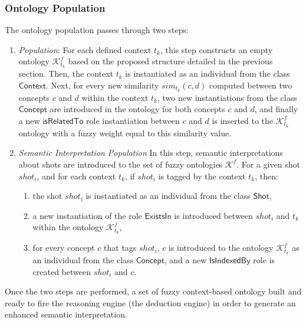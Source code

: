 		\subsubsection{Ontology Population}	
		\label{pop1}
		The ontology population  passes through two steps: 
		\begin{enumerate}
			\item \textit{ Population}: For each defined context $t_{k}$, 
			this step constructs an empty ontology $\mathcal{K}^{f}_{t_{k}}$ based on the proposed structure detailed in 
			the previous section. Then, the context $t_{k}$ is instantiated as an individual
			from the class $\mathsf{Context}$. Next, for every new similarity 
			$sim_{t_{k}}(c, d)$ computed between two concepts $c$ and $d$ within the 
			context $t_{k}$, two new instantiations from the class $\mathsf{Concept}$ 
			are introduced in the ontology for both concepts $c$ and $d$, and finally  
			a new $\mathsf{isRelatedTo}$ role instantiation between $c$ and $d$  
			is inserted to the $\mathcal{K}^{f}_{t_{k}}$ ontology with a fuzzy weight
			equal to this similarity value.
 
			\item \textit{Semantic Interpretation Population}
			In this step, semantic interpretations about shots 
			are introduced to the set of fuzzy ontologies $\mathcal{K}^{f}$. 
			For a given shot $shot_{i}$, and for each context $t_{k}$, if $shot_{i}$ 
			is tagged by the context $t_{k}$, then:
				\begin{enumerate}
					\item the shot $shot_{i}$ is instantiated as an individual from 
					the class $\mathsf{Shot}$,
					\item a new instantiation of the role $\mathsf{ExistsIn}$ is introduced 
					between $shot_{i}$ and $t_{k}$ within the ontology $\mathcal{K}^{f}_{t_{k}}$,
					\item for every concept $c$ that tags $shot_{i}$, $c$ is introduced to the 
					ontology $\mathcal{K}^{f}_{t_{k}}$ as an individual from the class 
					$\mathsf{Concept}$, and a new $\mathsf{IsIndexedBy}$ role 
					is created between $shot_{i}$ and $c$.
				\end{enumerate}
		\end{enumerate}

		Once the two steps are performed, a set of fuzzy context-based ontology  built and 
		ready to fire the reasoning engine (the deduction engine) in order to
		generate an enhanced semantic interpretation.
		
